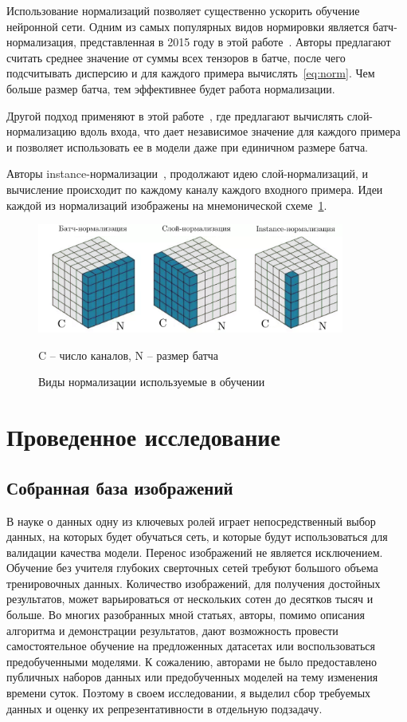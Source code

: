 \documentclass[11pt,a4paper]{extarticle}
\begin{document}
{		Использование нормализаций позволяет существенно ускорить обучение нейронной сети.
		Одним из самых популярных видов нормировки является батч-нормализация, представленная в 2015 году в этой работе~\cite{n_batch}.
		Авторы предлагают считать среднее значение от суммы всех тензоров в батче, после чего подсчитывать дисперсию и для каждого примера вычислять~\eqref{eq:norm}.
		Чем больше размер батча, тем эффективнее будет работа нормализации.

		Другой подход применяют в этой работе~\cite{n_layer}, где предлагают вычислять слой-нормализацию вдоль входа, что дает независимое значение для каждого примера и позволяет использовать ее в модели даже при единичном размере батча.
		
		Авторы instance-нормализации~\cite{n_instance}, продолжают идею слой-нормализаций, и вычисление происходит по каждому каналу каждого входного примера.
		Идеи каждой из нормализаций изображены на мнемонической схеме~\ref{pic:norm}.

		\begin{figure}[ht]
			\centering
			\includegraphics[width=0.9\textwidth]{img/norm}
			\caption{Виды нормализации используемые в обучении}{
				\small{
					C -- число каналов, N -- размер батча
				}
			}
			\label{pic:norm}
		\end{figure}


\newpage
\section{Проведенное исследование}
	
	\subsection{Собранная база изображений}\label{sec:data}
		
		В науке о данных одну из ключевых ролей играет непосредственный выбор данных, на которых будет обучаться сеть, и которые будут использоваться для валидации качества модели. Перенос изображений не является исключением.
		Обучение без учителя глубоких сверточных сетей требуют большого объема тренировочных данных.
		Количество изображений, для получения достойных результатов, может варьироваться от нескольких сотен до десятков тысяч и больше.
		Во многих разобранных мной статьях, авторы, помимо описания алгоритма и демонстрации результатов, дают возможность провести самостоятельное обучение на предложенных датасетах или воспользоваться предобученными моделями.
		К сожалению, авторами не было предоставлено публичных наборов данных или предобученных моделей на тему изменения времени суток.
		Поэтому в своем исследовании, я выделил сбор требуемых данных и оценку их репрезентативности в отдельную подзадачу.
		
}
\end{document}
